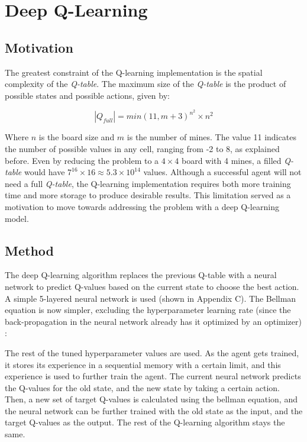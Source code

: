 \section{Deep Q-Learning}
\subsection{Motivation}
The greatest constraint of the Q-learning implementation is the spatial complexity of the \emph{Q-table}. 
The maximum size of the \emph{Q-table} is the product of possible states and possible actions, given by:

\[ |Q_{full}| = min(11, m + 3)^{n^2} \times n^2 \]

Where $n$ is the board size and $m$ is the number of mines.
The value 11 indicates the number of possible values in any cell, ranging from -2 to 8, as explained before.
Even by reducing the problem to a $4 \times 4$ board with 4 mines, a filled \emph{Q-table} would have $7^{16} \times 16 \approx 5.3 \times 10^{14}$ values.
Although a successful agent will not need a full \emph{Q-table}, the Q-learning implementation requires both more training time and more storage to produce desirable results.
This limitation served as a motivation to move towards addressing the problem with a deep Q-learning model.

\subsection{Method} %

The deep Q-learning algorithm replaces the previous Q-table with a neural network to predict Q-values based on the current state to choose the best action. A simple 5-layered neural network is used (shown in Appendix C). The Bellman equation is now simpler, excluding the hyperparameter learning rate (since the back-propagation in the neural network already has it optimized by an optimizer) \cite{tds}:



The rest of the tuned hyperparameter values are used. As the agent gets trained, it stores its experience in a sequential memory with a certain limit, and this experience is used to further train the agent. The current neural network predicts the Q-values for the old state, and the new state by taking a certain action. Then, a new set of target Q-values is calculated using the bellman equation, and the neural network can be further trained with the old state as the input, and the target Q-values as the output. The rest of the Q-learning algorithm stays the same.

